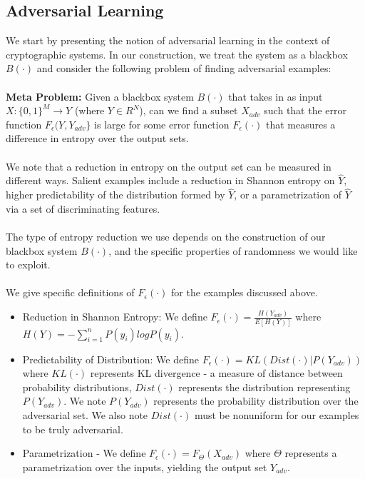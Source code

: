 \documentclass[letterpaper,twocolumn,10pt]{article}
\begin{document}
\subsection{Adversarial Learning}
We start by presenting the notion of adversarial learning in the context of cryptographic systems. In our construction, we treat the system as a blackbox $B(\cdot)$ and consider the following problem of finding adversarial examples:
\\
\\
\textbf{Meta Problem:} Given a blackbox system $B(\cdot)$ that takes in as input $X: \{0,1\}^{M} \rightarrow Y$ (where $Y \in R^{N}$), can we find a subset $X_{adv}$ such that the error function $F_{\epsilon} (Y, Y_{adv} \}$ is large for some error function $F_{\epsilon}(\cdot )$ that measures a difference in entropy over the output sets.
\\
\\
We note that a reduction in entropy on the output set can be measured in different ways. Salient examples include a reduction in Shannon entropy on $\hat{Y}$, higher predictability of the distribution formed by $\hat{Y}$, or a parametrization of $\hat{Y}$ via a set of discriminating features.
\\
\\
The type of entropy reduction we use depends on the construction of our blackbox system $B(\cdot)$, and the specific properties of randomness we would like to exploit.  
\\
\\
We give specific definitions of $F_{\epsilon}(\cdot)$ for the examples discussed above. 
\begin{itemize}
\item Reduction in Shannon Entropy: We define $F_{\epsilon} (\cdot) = \frac{H(Y_{adv})}{E[H(Y)]}$ where $H(Y) = -\sum_{i=1}^{n} P(y_{i}) log P(y_{i})$.  
\item Predictability of Distribution: We define $F_{\epsilon} (\cdot) = KL(Dist (\cdot) | P(Y_{adv}))$ where $KL(\cdot)$ represents KL divergence - a measure of distance between probability distributions, $Dist(\cdot)$ represents the distribution representing $P(Y_{adv})$. We note $P(Y_{adv})$ represents the probability distribution over the adversarial set. We also note $Dist(\cdot)$ must be nonuniform for our examples to be truly adversarial. 
\item Parametrization - We define $F_{\epsilon} (\cdot) = F_{\Theta}(X_{adv})$ where $\Theta$ represents a parametrization over the inputs, yielding the output set $Y_{adv}$.
\end{itemize}
\end{document}
